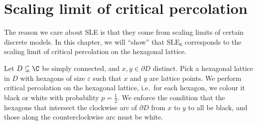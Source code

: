 \documentclass[a4paper]{article}
\newcommand\SLE{\mathrm{SLE}}
\begin{document}
\section{Scaling limit of critical percolation}\label{sec:percolation}
The reason we care about SLE is that they come from scaling limits of certain discrete models. In this chapter, we will ``show'' that $\SLE_6$ corresponds to the scaling limit of critical percolation on the hexagonal lattice.

Let $D \subseteq \C$ be simply connected, and $x, y \in \partial D$ distinct. Pick a hexagonal lattice in $D$ with hexagons of size $\varepsilon$ such that $x$ and $y$ are lattice points. We perform critical percolation on the hexagonal lattice, i.e.\ for each hexagon, we colour it black or white with probability $p = \frac{1}{2}$. We enforce the condition that the hexagons that intersect the clockwise arc of $\partial D$ from $x$ to $y$ to all be black, and those along the counterclockwise arc must be white.
\end{document}
